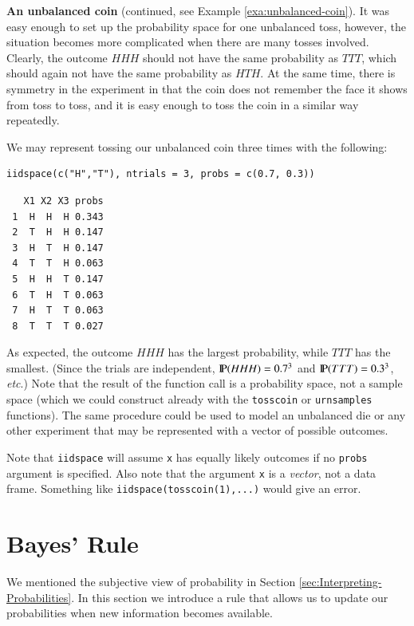 \documentclass[captions=tableheading]{scrbook}
\begin{document}
\begin{example}
\textbf{An unbalanced coin} (continued, see Example \ref{exa:unbalanced-coin}). It was easy enough to set up the probability space for one unbalanced toss, however, the situation becomes more complicated when there are many tosses involved. Clearly, the outcome \(HHH\) should not have the same probability as \(TTT\), which should again not have the same probability as \(HTH\). At the same time, there is symmetry in the experiment in that the coin does not remember the face it shows from toss to toss, and it is easy enough to toss the coin in a similar way repeatedly.

We may represent tossing our unbalanced coin three times with the following: 


\begin{verbatim}
iidspace(c("H","T"), ntrials = 3, probs = c(0.7, 0.3))
\end{verbatim}

\begin{verbatim}
   X1 X2 X3 probs
 1  H  H  H 0.343
 2  T  H  H 0.147
 3  H  T  H 0.147
 4  T  T  H 0.063
 5  H  H  T 0.147
 6  T  H  T 0.063
 7  H  T  T 0.063
 8  T  T  T 0.027
\end{verbatim}

As expected, the outcome \(HHH\) has the largest probability, while \(TTT\) has the smallest. (Since the trials are independent, \(\P(HHH)=0.7^{3}\) and \(\P(TTT)=0.3^{3}\), \textit{etc}.) Note that the result of the function call is a probability space, not a sample space (which we could construct already with the \texttt{tosscoin} or \texttt{urnsamples} functions). The same procedure could be used to model an unbalanced die or any other experiment that may be represented with a vector of possible outcomes.

\end{example}

Note that \texttt{iidspace} will assume \texttt{x} has equally likely outcomes if no \texttt{probs} argument is specified. Also note that the argument \texttt{x} is a \emph{vector}, not a data frame. Something like \texttt{iidspace(tosscoin(1),...)} would give an error.
\section{Bayes' Rule}
\label{sec-3-8}

\label{sec:Bayes'-Rule}

We mentioned the subjective view of probability in Section \ref{sec:Interpreting-Probabilities}. In this section we introduce a rule that allows us to update our probabilities when new information becomes available. 
\end{document}

